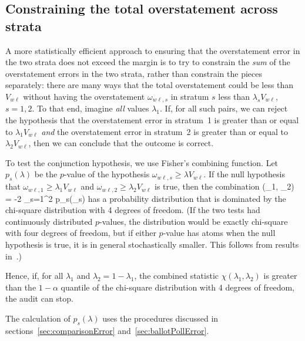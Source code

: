 \subsection{Constraining the total overstatement across strata}
A more statistically efficient approach to ensuring that the overstatement error in the 
two strata does not
exceed the margin is to try to constrain the \emph{sum} of the overstatement errors in the two
strata, rather than constrain the pieces separately:
there are many ways that the total overstatement could be less than $V_{w\ell}$ without
having the overstatement $\omega_{w\ell,s}$
in stratum $s$ less than $\lambda_s V_{w\ell}$, $s = 1, 2$.
To that end, imagine \emph{all} values $\lambda_1$.
If, for all such pairs, we can reject the hypothesis that the 
overstatement error in stratum~1 is greater than or equal to $\lambda_1 V_{w\ell}$ \emph{and} 
the overstatement error in stratum~2 is greater than or equal to $\lambda_2 V_{w\ell}$, then
we can conclude that the outcome is correct.

To test the  conjunction hypothesis, we use Fisher's combining function.
Let $p_s(\lambda)$ be the $p$-value of the hypothesis $\omega_{w\ell,s} \ge \lambda V_{w\ell}$.
If the null hypothesis that $\omega_{w\ell,1} \ge \lambda_1 V_{w\ell}$ and 
$\omega_{w\ell,2} \ge \lambda_2 V_{w\ell}$ is true, then the combination
\beq
   \chi(\lambda_1, \lambda_2) = -2 \sum_{s=1}^2 \ln p_s(\lambda_s)
\eeq
has a probability distribution that is dominated by the chi-square distribution with 4 degrees
of freedom.
(If the two tests had continuously distributed $p$-values, the distribution would be exactly
chi-square with four degrees of freedom, but if either $p$-value has atoms when
the null hypothesis is true, it is in general stochastically smaller.
This follows from results in~\citep{???}.)

Hence, if, for all $\lambda_1$ and $\lambda_2 = 1- \lambda_1$,
the combined statistic $\chi(\lambda_1, \lambda_2)$ is greater than the 
$1-\alpha$ quantile of the chi-square
distribution with 4 degrees of freedom, the audit can stop.

The calculation of $p_s(\lambda)$ 
uses the procedures discussed in 
sections~\ref{sec:comparisonError} and~\ref{sec:ballotPollError}.